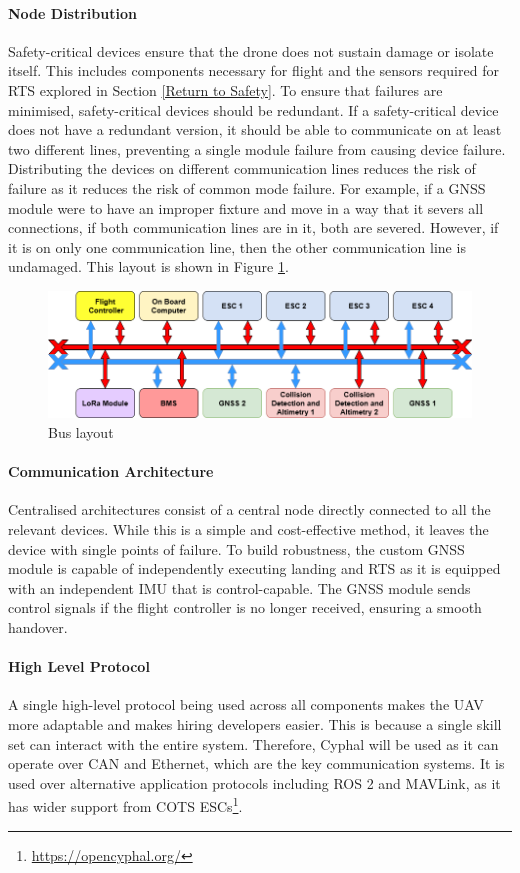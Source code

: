 \paragraph{Node Distribution}
Safety-critical devices ensure that the drone does not sustain damage or isolate itself. This includes components necessary for flight and the sensors required for \gls{RTS} explored in Section \ref{Return to Safety}. To ensure that failures are minimised, safety-critical devices should be redundant. If a safety-critical device does not have a redundant version, it should be able to communicate on at least two different lines, preventing a single module failure from causing device failure. Distributing the devices on different communication lines reduces the risk of failure as it reduces the risk of common mode failure. For example, if a \gls{GNSS} module were to have an improper fixture and move in a way that it severs all connections, if both communication lines are in it, both are severed. However, if it is on only one communication line, then the other communication line is undamaged. This layout is shown in Figure \ref{fig:CAN_bus}. 
 \begin{figure}[h]
 \centering
  \includegraphics[width=1\textwidth]{figs/Thomas/Intra Communication/CAN bus.png}
 \caption{Bus layout}
 \label{fig:CAN_bus}
 \end{figure}
\paragraph{Communication Architecture}
Centralised architectures consist of a central node directly connected to all the relevant devices. While this is a simple and cost-effective method, it leaves the device with single points of failure. To build robustness, the custom \gls{GNSS} module is capable of independently executing landing and \gls{RTS} as it is equipped with an independent \gls{IMU} that is control-capable. The \gls{GNSS} module sends control signals if the flight controller is no longer received, ensuring a smooth handover. 
\paragraph{High Level Protocol}
A single high-level protocol being used across all components makes the \gls{UAV} more adaptable and makes hiring developers easier. This is because a single skill set can interact with the entire system. Therefore, Cyphal will be used as it can operate over \gls{CAN} and Ethernet, which are the key communication systems. It is used over alternative application protocols including ROS 2 and MAVLink, as it has wider support from \gls{COTS} \gls{ESC}s\footnote{\url{https://opencyphal.org/}}. 
